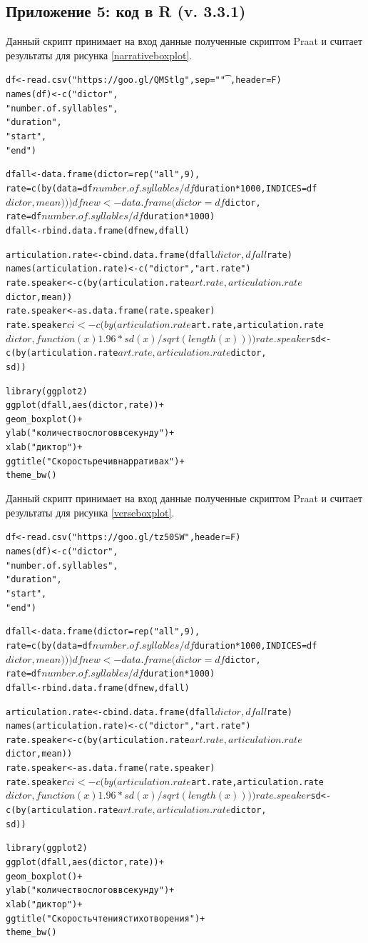 \subsection{Приложение 5: код в R (v. 3.3.1)} \label{Rscript}
\noindent Данный скрипт принимает на вход данные полученные скриптом Praat и считает результаты для рисунка \ref{narrativeboxplot}.
\scriptsize
\begin{alltt}
df <- read.csv("https://goo.gl/QMStlg", sep = "\t", header = F)
names(df) <- c("dictor",
               "number.of.syllables",
               "duration",
               "start",
               "end")

dfall <- data.frame(dictor = rep("all", 9),
                    rate = c(by(data = df$number.of.syllables/df$duration*1000, INDICES = df$dictor, mean)))
dfnew <- data.frame(dictor = df$dictor,
                    rate = df$number.of.syllables/df$duration*1000)
dfall <- rbind.data.frame(dfnew, dfall)

articulation.rate <- cbind.data.frame(dfall$dictor, dfall$rate)
names(articulation.rate) <- c("dictor", "art.rate")
rate.speaker <- c(by(articulation.rate$art.rate, articulation.rate$dictor, mean))
rate.speaker <- as.data.frame(rate.speaker)
rate.speaker$ci <- c(by(articulation.rate$art.rate, articulation.rate$dictor, 
                        function(x){1.96*sd(x)/sqrt(length(x))}))
rate.speaker$sd <- c(by(articulation.rate$art.rate, articulation.rate$dictor, 
                        sd))

library(ggplot2)
ggplot(dfall, aes(dictor, rate))+
  geom_boxplot()+
  ylab("количество слогов в секунду")+
  xlab("диктор")+
  ggtitle("Скорость речи в нарративах")+
  theme_bw()
\end{alltt}
\normalsize
\noindent Данный скрипт принимает на вход данные полученные скриптом Praat и считает результаты для рисунка \ref{verseboxplot}.
\scriptsize
\begin{alltt}
df <- read.csv("https://goo.gl/tz50SW", header = F)
names(df) <- c("dictor",
               "number.of.syllables",
               "duration",
               "start",
               "end")

dfall <- data.frame(dictor = rep("all", 9),
  rate = c(by(data = df$number.of.syllables/df$duration*1000, INDICES = df$dictor, mean)))
dfnew <- data.frame(dictor = df$dictor,
                    rate = df$number.of.syllables/df$duration*1000)
dfall <- rbind.data.frame(dfnew, dfall)

articulation.rate <- cbind.data.frame(dfall$dictor, dfall$rate)
names(articulation.rate) <- c("dictor", "art.rate")
rate.speaker <- c(by(articulation.rate$art.rate, articulation.rate$dictor, mean))
rate.speaker <- as.data.frame(rate.speaker)
rate.speaker$ci <- c(by(articulation.rate$art.rate, articulation.rate$dictor, 
                        function(x){1.96*sd(x)/sqrt(length(x))}))
rate.speaker$sd <- c(by(articulation.rate$art.rate, articulation.rate$dictor, 
                        sd))

library(ggplot2)
ggplot(dfall, aes(dictor, rate))+
  geom_boxplot()+
  ylab("количество слогов в секунду")+
  xlab("диктор")+
  ggtitle("Скорость чтения стихотворения")+
  theme_bw()
\end{alltt}
